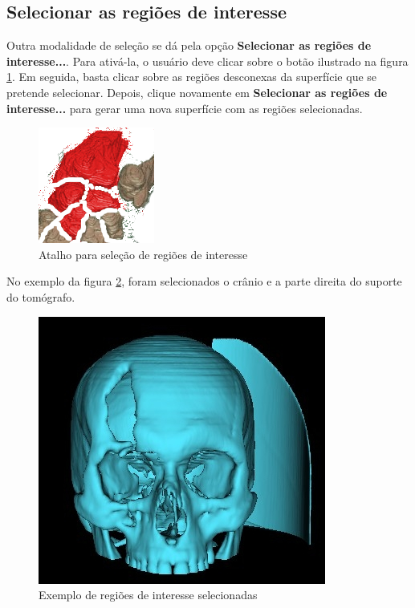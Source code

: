 \newpage

\subsection{Selecionar as regiões de interesse}

Outra modalidade de seleção se dá pela opção \textbf{Selecionar as regiões de interesse...}.
Para ativá-la, o usuário deve clicar sobre o botão ilustrado na figura
\ref{fig:short_connectivity_manual}. Em seguida, basta clicar sobre as regiões desconexas
da superfície que se pretende selecionar. Depois, clique novamente em \textbf{Selecionar as regiões de interesse...}
para gerar uma nova superfície com as regiões selecionadas.

\begin{figure}[!htb]
\centering
\includegraphics[scale=0.2]{../user_guide_figures/icons/connectivity_manual.png}
\caption{Atalho para seleção de regiões de interesse}
\label{fig:short_connectivity_manual}
\end{figure}

No exemplo da figura \ref{fig:extract_most_region3}, foram selecionados o crânio e a parte
direita do suporte do tomógrafo.

\begin{figure}[!htb]
\centering
\includegraphics[scale=0.35]{../user_guide_figures/invesalius_screen/surface_extract_most_region3.jpg}
\caption{Exemplo de regiões de interesse selecionadas}
\label{fig:extract_most_region3}
\end{figure}


